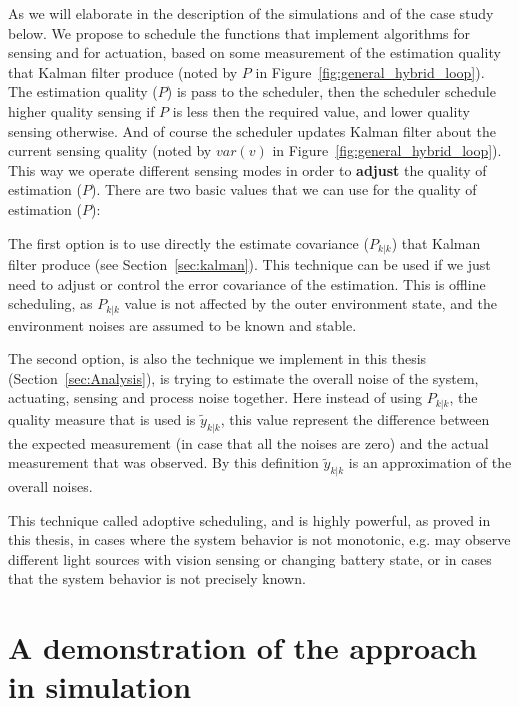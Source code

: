 \documentclass[ twoside, 12pt ]{article}
\begin{document}
As we will elaborate in the description of the simulations and of the case study below. We propose to schedule the functions that implement algorithms for sensing and for actuation, based on some measurement of the estimation quality that Kalman filter produce (noted by $P$ in Figure~\ref{fig:general_hybrid_loop}).
The estimation quality ($P$) is pass to the scheduler, then the scheduler schedule higher quality sensing if $P$ is less then the required value, and lower quality sensing otherwise. And of course the scheduler updates Kalman filter about the current sensing quality (noted by $var(v)$ in Figure~\ref{fig:general_hybrid_loop}).   
This way we operate different sensing modes in order to \textbf{adjust} the quality of estimation ($P$).
There are two basic values that we can use for the quality of estimation ($P$):

The first option is to use directly the estimate covariance ($P_{k|k}$) that Kalman filter produce (see Section~\ref{sec:kalman}). This technique can be used if we just need to adjust or control the error covariance of the estimation. This is offline scheduling, as $P_{k|k}$ value is not affected by the outer environment state, and the environment noises are assumed to be known and stable.
    
The second option, is also the technique we implement in this thesis (Section~\ref{sec:Analysis}), is trying to estimate the overall noise of the system, actuating, sensing and process noise together. Here instead of using $P_{k|k}$, the quality measure that is used is $\tilde{y}_{k|k}$, this value represent the difference between the expected measurement (in case that all the noises are zero) and the actual measurement that was observed. By this definition $\tilde{y}_{k|k}$ is an approximation of the overall noises.
    
This technique called adoptive scheduling, and is highly powerful, as proved in this thesis, in cases where the system behavior is not monotonic, e.g. may observe different light sources with vision sensing or changing battery state, or in cases that the system behavior is not precisely known.


\section{A demonstration of the approach in simulation}
\label{sec:simulation}
\end{document}
